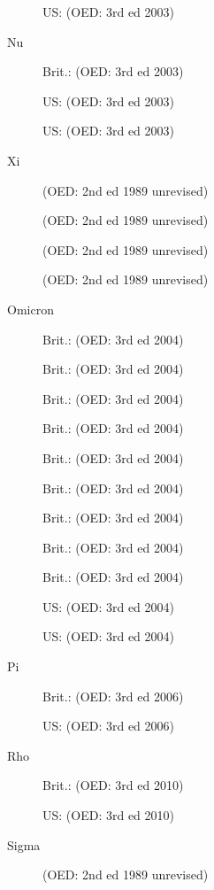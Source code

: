 \begin{description}
                US:  (OED: 3rd ed 2003)

    \item[Nu] Brit.:  (OED: 3rd ed 2003)

                US:  (OED: 3rd ed 2003)

                US:  (OED: 3rd ed 2003)

    \item[Xi]  (OED: 2nd ed 1989 unrevised)

                 (OED: 2nd ed 1989 unrevised)

                 (OED: 2nd ed 1989 unrevised)

                 (OED: 2nd ed 1989 unrevised)

    \item[Omicron] Brit.:  (OED: 3rd ed 2004)

                    Brit.:  (OED: 3rd ed 2004)

                    Brit.:  (OED: 3rd ed 2004)

                    Brit.:  (OED: 3rd ed 2004)

                    Brit.:  (OED: 3rd ed 2004)

                    Brit.:  (OED: 3rd ed 2004)

                    Brit.:  (OED: 3rd ed 2004)

                    Brit.:  (OED: 3rd ed 2004)

                    Brit.:  (OED: 3rd ed 2004)

                    US:  (OED: 3rd ed 2004)

                    US:  (OED: 3rd ed 2004)

    \item[Pi] Brit.:  (OED: 3rd ed 2006)

                    US:  (OED: 3rd ed 2006)

    \item[Rho] Brit.:  (OED: 3rd ed 2010)

                US:  (OED: 3rd ed 2010)

    \item[Sigma]  (OED: 2nd ed 1989 unrevised)


\end{description}
